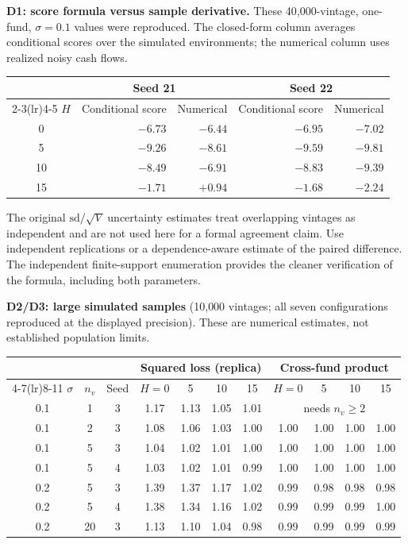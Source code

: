 \documentclass[11pt]{article}
\theoremstyle{plain}
\theoremstyle{definition}
\begin{document}
\textbf{D1: score formula versus sample derivative.} These 40,000-vintage, one-fund, $\sigma=0.1$ values were reproduced. The closed-form column averages conditional scores over the simulated environments; the numerical column uses realized noisy cash flows.
\begin{center}
\small
\begin{tabular}{@{}crrrr@{}}
\toprule
& \multicolumn{2}{c}{Seed 21} & \multicolumn{2}{c}{Seed 22}\\
\cmidrule(lr){2-3}\cmidrule(lr){4-5}
$H$ & Conditional score & Numerical & Conditional score & Numerical\\
\midrule
0 & $-6.73$ & $-6.44$ & $-6.95$ & $-7.02$\\
5 & $-9.26$ & $-8.61$ & $-9.59$ & $-9.81$\\
10 & $-8.49$ & $-6.91$ & $-8.83$ & $-9.39$\\
15 & $-1.71$ & $+0.94$ & $-1.68$ & $-2.24$\\
\bottomrule
\end{tabular}
\end{center}
The original $\mathrm{sd}/\sqrt V$ uncertainty estimates treat overlapping vintages as independent and are not used here for a formal agreement claim. Use independent replications or a dependence-aware estimate of the paired difference. The independent finite-support enumeration provides the cleaner verification of the formula, including both parameters.

\textbf{D2/D3: large simulated samples} (10{,}000 vintages; all seven configurations reproduced at the displayed precision). These are numerical estimates, not established population limits.
\begin{center}
\small
\begin{tabular}{ccc cccc cccc}
\toprule
& & & \multicolumn{4}{c}{Squared loss (replica)} & \multicolumn{4}{c}{Cross-fund product}\\
\cmidrule(lr){4-7}\cmidrule(lr){8-11}
$\sigma$ & $n_v$ & Seed & $H=0$ & 5 & 10 & 15 & $H=0$ & 5 & 10 & 15\\
\midrule
0.1 & 1 & 3 & 1.17 & 1.13 & 1.05 & 1.01 & \multicolumn{4}{c}{needs $n_v\ge2$}\\
0.1 & 2 & 3 & 1.08 & 1.06 & 1.03 & 1.00 & 1.00 & 1.00 & 1.00 & 1.00\\
0.1 & 5 & 3 & 1.04 & 1.02 & 1.01 & 1.00 & 1.00 & 1.00 & 1.00 & 1.00\\
0.1 & 5 & 4 & 1.03 & 1.02 & 1.01 & 0.99 & 1.00 & 1.00 & 1.00 & 1.00\\
0.2 & 5 & 3 & 1.39 & 1.37 & 1.17 & 1.02 & 0.99 & 0.98 & 0.98 & 0.98\\
0.2 & 5 & 4 & 1.38 & 1.34 & 1.16 & 1.02 & 0.99 & 0.99 & 0.99 & 1.00\\
0.2 & 20 & 3 & 1.13 & 1.10 & 1.04 & 0.98 & 0.99 & 0.99 & 0.99 & 0.99\\
\bottomrule
\end{tabular}
\end{center}
\end{document}
